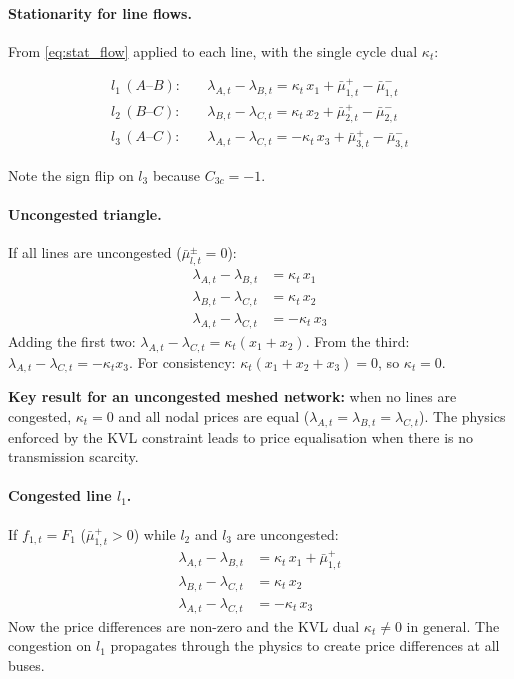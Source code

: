 \documentclass{article}
\begin{document}
\paragraph{Stationarity for line flows.}
From \eqref{eq:stat_flow} applied to each line, with the single cycle dual $\kappa_t$:

\begin{align}
    l_1\,(A\text{--}B): &\quad \lambda_{A,t} - \lambda_{B,t}
    = \kappa_t\, x_1 + \bar{\mu}^+_{1,t} - \bar{\mu}^-_{1,t} \\
    l_2\,(B\text{--}C): &\quad \lambda_{B,t} - \lambda_{C,t}
    = \kappa_t\, x_2 + \bar{\mu}^+_{2,t} - \bar{\mu}^-_{2,t} \\
    l_3\,(A\text{--}C): &\quad \lambda_{A,t} - \lambda_{C,t}
    = -\kappa_t\, x_3 + \bar{\mu}^+_{3,t} - \bar{\mu}^-_{3,t}
\end{align}

Note the sign flip on $l_3$ because $C_{3c} = -1$.

\paragraph{Uncongested triangle.}
If all lines are uncongested ($\bar{\mu}^{\pm}_{l,t} = 0$):
\begin{align}
    \lambda_{A,t} - \lambda_{B,t} &= \kappa_t\, x_1 \\
    \lambda_{B,t} - \lambda_{C,t} &= \kappa_t\, x_2 \\
    \lambda_{A,t} - \lambda_{C,t} &= -\kappa_t\, x_3
\end{align}
Adding the first two: $\lambda_{A,t} - \lambda_{C,t} = \kappa_t(x_1 + x_2)$.
From the third: $\lambda_{A,t} - \lambda_{C,t} = -\kappa_t x_3$.
For consistency: $\kappa_t(x_1 + x_2 + x_3) = 0$, so $\kappa_t = 0$.

\textbf{Key result for an uncongested meshed network:}
when no lines are congested, $\kappa_t = 0$ and all nodal prices are
equal ($\lambda_{A,t} = \lambda_{B,t} = \lambda_{C,t}$). The physics
enforced by the KVL constraint leads to price equalisation when
there is no transmission scarcity.

\paragraph{Congested line $l_1$.}
If $f_{1,t} = F_1$ ($\bar{\mu}^+_{1,t} > 0$) while $l_2$ and $l_3$
are uncongested:
\begin{align}
    \lambda_{A,t} - \lambda_{B,t} &= \kappa_t\, x_1 + \bar{\mu}^+_{1,t} \\
    \lambda_{B,t} - \lambda_{C,t} &= \kappa_t\, x_2 \\
    \lambda_{A,t} - \lambda_{C,t} &= -\kappa_t\, x_3
\end{align}
Now the price differences are non-zero and the KVL dual $\kappa_t \ne 0$
in general. The congestion on $l_1$ propagates through the physics to
create price differences at all buses.
\end{document}

